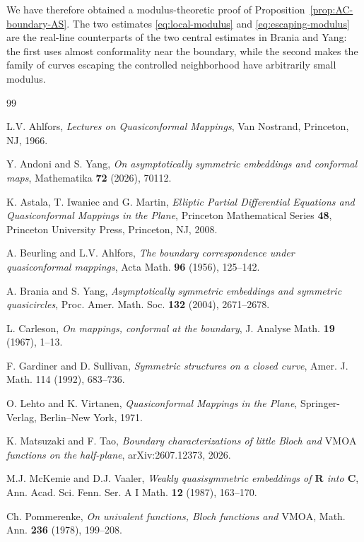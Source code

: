 \documentclass[11pt]{amsart}
\numberwithin{equation}{section}
\theoremstyle{definition} %
\theoremstyle{remarkstyle}
\begin{document}
We have therefore obtained a modulus-theoretic proof of Proposition~\ref{prop:AC-boundary-AS}.  
The two estimates \eqref{eq:local-modulus} and \eqref{eq:escaping-modulus} are the real-line counterparts of the two central estimates in Brania and Yang: the first uses almost conformality near the boundary, while the second makes the family of curves escaping the controlled neighborhood have arbitrarily small modulus.



\begin{thebibliography}{99}

 L.V. Ahlfors, {\it Lectures on Quasiconformal Mappings}, Van Nostrand, Princeton, NJ, 1966.

 Y. Andoni and S. Yang, {\it On asymptotically symmetric embeddings and conformal maps}, Mathematika {\bf 72} (2026), 70112.

 K. Astala, T. Iwaniec and G. Martin, {\it Elliptic Partial Differential Equations and Quasiconformal Mappings in the Plane}, Princeton Mathematical Series {\bf 48}, Princeton University Press, Princeton, NJ, 2008.

 A. Beurling and L.V. Ahlfors, {\it The boundary correspondence under quasiconformal mappings}, Acta Math. {\bf 96} (1956), 125--142.

 A. Brania and S. Yang, {\it Asymptotically symmetric embeddings and symmetric quasicircles},
Proc. Amer. Math. Soc. {\bf 132} (2004), 2671--2678.

 L. Carleson, {\it On mappings, conformal at the boundary}, J. Analyse Math. {\bf 19} (1967), 1--13.

 F. Gardiner and D. Sullivan, {\it Symmetric structures on a closed curve}, Amer. J. Math. 114 (1992), 683--736.

 O. Lehto and K. Virtanen, {\it Quasiconformal Mappings in the Plane}, Springer-Verlag, Berlin--New York, 1971.

 K. Matsuzaki and F. Tao, {\it Boundary characterizations of little Bloch and $\mathrm{VMOA}$ functions on the half-plane}, arXiv:2607.12373, 2026.

 M.J. McKemie and D.J. Vaaler, {\it Weakly quasisymmetric embeddings of $\mathbf R$ into $\mathbf C$}, Ann. Acad. Sci. Fenn. Ser. A I Math. {\bf 12} (1987), 163--170.

 Ch. Pommerenke, {\it On univalent functions, Bloch functions and $\mathrm{VMOA}$}, Math. Ann. {\bf 236} (1978), 199--208.


\end{thebibliography}
\end{document}
